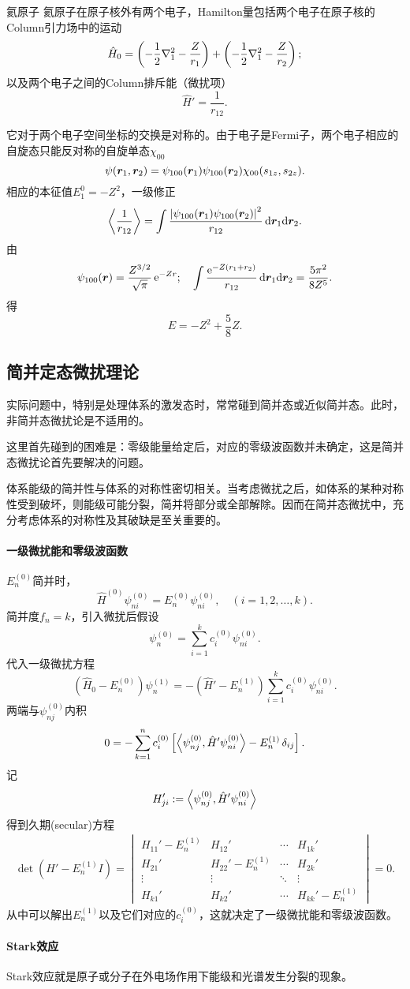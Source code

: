 \begin{example}{氦原子}{}
	氦原子在原子核外有两个电子，Hamilton量包括两个电子在原子核的Column引力场中的运动
	\[\hat H_0=\left(-\frac12\nabla_1^2-\frac Z{r_1}\right)+\left(-\frac12\nabla_1^2-\frac Z{r_2}\right);\]
	以及两个电子之间的Column排斥能（微扰项）
	\[\hat H'=\frac1{r_{12}}.\]

	它对于两个电子空间坐标的交换是对称的。由于电子是Fermi子，两个电子相应的自旋态只能反对称的自旋单态$\chi_{00}$
	\[\psi(\bm r_1,\bm r_2)=\psi_{100}(\bm r_1)\psi_{100}(\bm r_2)\chi_{00}(s_{1z},s_{2z}).\]
	相应的本征值$E_1^0=-Z^2$，一级修正
	\[\left\langle \frac1{r_{12}}\right\rangle=\int\frac{\left\lvert\psi_{100}(\bm r_1)\psi_{100}(\bm r_2)\right\rvert^2}{r_{12}}\mathop{}\!\mathrm{d}\bm r_1\mathrm{d}\bm r_2.\]
	由
	\[\psi_{100}(\bm r)=\frac{Z^{3/2}}{\sqrt\pi}\mathop{}\!\mathrm{e}^{-Zr};\quad \int\frac{\mathop{}\!\mathrm{e}^{-Z(r_1+r_2)}}{r_{12}}\mathop{}\!\mathrm{d}\bm r_1\mathrm{d}\bm r_2=\frac{5\pi^2}{8Z^5}.\]
	得
	\[E=-Z^2+\frac58Z.\]
\end{example}
\subsection{简并定态微扰理论}
实际问题中，特别是处理体系的激发态时，常常碰到简并态或近似简并态。此时，非简并态微扰论是不适用的。

这里首先碰到的困难是：零级能量给定后，对应的零级波函数并未确定，这是简并态微扰论首先要解决的问题。

体系能级的简并性与体系的对称性密切相关。当考虑微扰之后，如体系的某种对称性受到破坏，则能级可能分裂，简并将部分或全部解除。因而在简并态微扰中，充分考虑体系的对称性及其破缺是至关重要的。
\paragraph*{一级微扰能和零级波函数}$E_n^{(0)}$简并时，
\[\hat H^{(0)}\psi_{ni}^{(0)}=E_n^{(0)}\psi_{ni}^{(0)},\quad (i=1,2,\ldots,k).\]
简并度$f_n=k$，引入微扰后假设
\[\psi_n^{(0)}=\sum_{i=1}^kc_i^{(0)}\psi_{ni}^{(0)}.\]
代入一级微扰方程
\[(\hat H_0-E_n^{(0)})\psi_n^{(1)}=-(\hat H'-E_n^{(1)})\sum_{i=1}^kc_i^{(0)}\psi_{ni}^{(0)}.\]
两端与$\psi_{nj}^{(0)}$内积
\[0=-\sum_{k=1}^nc_i^{(0)}\left[\left\langle \psi_{nj}^{(0)},\hat H'\psi_{ni}^{(0)}\right\rangle-E_n^{(1)}\mathop{}\!\delta_{ij}\right].\]
记
\begin{align}
	H_{ji}':=\left\langle \psi_{nj}^{(0)},\hat H'\psi_{ni}^{(0)}\right\rangle
\end{align}
得到久期(secular)方程
\begin{align}
	\det(H'-E_n^{(1)}I)=\begin{vmatrix}
		H_{11}'-E_n^{(1)}&H_{12}'&\cdots&H_{1k}'\\
		H_{21}'&H_{22}'-E_n^{(1)}&\cdots&H_{2k}'\\
		\vdots&\vdots&\ddots&\vdots\\
		H_{k1}'&H_{k2}'&\cdots&H_{kk}'-E_n^{(1)}
	\end{vmatrix}=0.
\end{align}
从中可以解出$E_n^{(1)}$以及它们对应的$c_i^{(0)}$，这就决定了一级微扰能和零级波函数。
\paragraph*{Stark效应}Stark效应就是原子或分子在外电场作用下能级和光谱发生分裂的现象。

